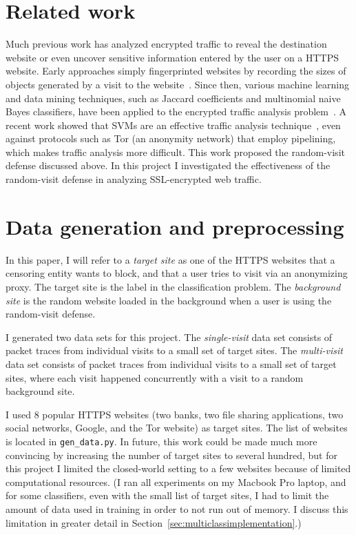 \documentclass[10pt, twocolumn]{article}
\begin{document}
\section{Related work}

Much previous work has analyzed encrypted traffic to reveal the destination website or 
even uncover sensitive information entered by the user on a HTTPS website. Early
approaches simply fingerprinted websites by recording the sizes of objects generated 
by a visit to the website~\cite{safeweb}. Since then, various machine learning 
and data mining techniques, such as Jaccard coefficients and multinomial naive Bayes classifiers,
have been applied to the encrypted traffic analysis problem~\cite{herrmann,liberatore}. 
A recent work showed that SVMs are an effective traffic analysis technique~\cite{tor}, even 
against protocols such as Tor (an anonymity network) that employ pipelining, which makes 
traffic analysis more difficult. This work proposed the random-visit defense discussed above. In 
this project I investigated the effectiveness of the random-visit defense in analyzing 
SSL-encrypted web traffic.

\section{Data generation and preprocessing}

In this paper, I will refer to a \textit{target site} as one of the HTTPS websites that a censoring 
entity wants to block, and that a user tries to visit via an anonymizing proxy.
 The target site is the label in the classification 
problem. The \textit{background site} is the random website loaded in the background when a 
user is using the random-visit defense.

I generated two data sets for this project. The \textit{single-visit} data set consists of packet 
traces from individual visits to a small set of target sites. The \textit{multi-visit} data set 
consists of packet traces from individual visits to a small set of target sites, where each visit 
happened concurrently with a visit to a random background site.

I used 8 popular HTTPS websites (two banks, two file sharing applications, two social networks, 
Google, and the Tor website) as target sites. The list of websites is located in \texttt{gen\_data.py}.
In future, this work could be made much more convincing by increasing the number of target sites 
to several hundred, but for this project I limited the closed-world setting to a few websites 
because of limited computational resources. (I ran all experiments on my Macbook Pro laptop, and 
for some classifiers, even with the small list of target sites, I had to limit the amount of data 
used in training in order to not run out of memory. I discuss this limitation in greater detail 
in Section~\ref{sec:multiclassimplementation}.)
\end{document}
